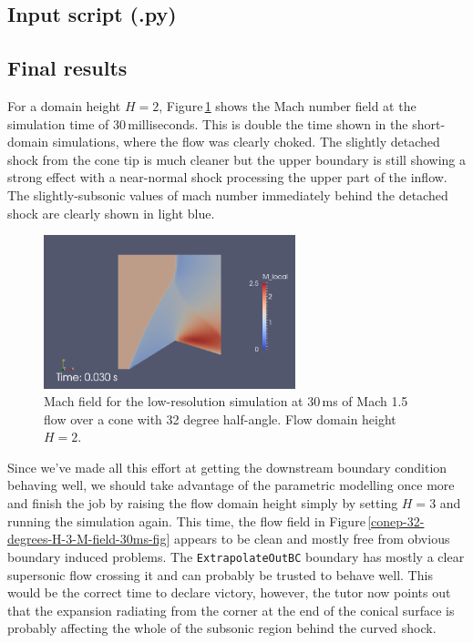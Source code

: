 \subsection{Input script (.py)}
%

\noindent\topbar

\bottombar

\subsection{Final results}
%
For a domain height $H=2$, Figure\,\ref{conep-32-degrees-H-2-M-field-30ms-fig} 
shows the Mach number field at the simulation time of 30\,milliseconds.
This is double the time shown in the short-domain simulations, where the flow was clearly choked.
The slightly detached shock from the cone tip is much cleaner but the upper boundary is
still showing a strong effect with a near-normal shock processing the upper part of the inflow.
The slightly-subsonic values of mach number immediately behind the detached shock are clearly
shown in light blue.

\begin{figure}[htbp]
\begin{center}
\includegraphics[width=0.65\textwidth]{../2D/cone20-parametric/conepe-M1p5-32degree-H-2p0-M-field-30ms.png}
\end{center}
\caption{Mach field for the low-resolution simulation at 30\,ms
         of Mach 1.5 flow over a cone with 32 degree half-angle.
         Flow domain height $H=2$.}
\label{conep-32-degrees-H-2-M-field-30ms-fig}
\end{figure}

\medskip
Since we've made all this effort at getting the downstream boundary condition behaving well,
we should take advantage of the parametric modelling once more and finish the job 
by raising the flow domain height simply by setting $H = 3$ and running the simulation again.
This time, the flow field in Figure\,\ref{conep-32-degrees-H-3-M-field-30ms-fig} appears to be clean 
and mostly free from obvious boundary induced problems.
The \verb!ExtrapolateOutBC! boundary has mostly a clear supersonic flow crossing it and can probably
be trusted to behave well.
This would be the correct time to declare victory, however, 
the tutor now points out that the expansion radiating from the corner at the end of the conical surface
is probably affecting the whole of the subsonic region behind the curved shock.

